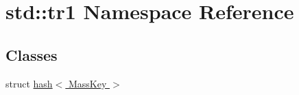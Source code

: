 \hypertarget{namespacestd_1_1tr1}{\section{std\-:\-:tr1 Namespace Reference}
\label{namespacestd_1_1tr1}
}
\subsection*{Classes}
\begin{DoxyCompactItemize}
\item 
struct \hyperlink{structstd_1_1tr1_1_1hash_3_01MassKey_01_4}{hash$<$ Mass\-Key $>$}
\end{DoxyCompactItemize}
